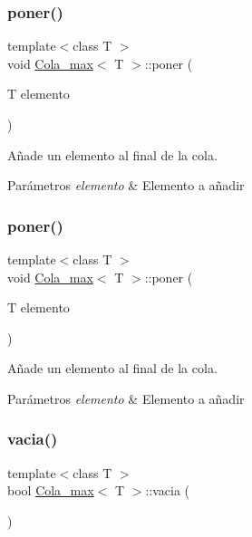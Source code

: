 \subsubsection{\texorpdfstring{poner()}{poner()}\hspace{0.1cm}{\footnotesize\ttfamily [1/2]}}
{\footnotesize\ttfamily template$<$class T $>$ \\
void \hyperlink{classCola__max}{Cola\+\_\+max}$<$ T $>$\+::poner (\begin{DoxyParamCaption}\item[{T}]{elemento }\end{DoxyParamCaption})}



Añade un elemento al final de la cola. 


\begin{DoxyParams}{Parámetros}
{\em elemento} & Elemento a añadir \\
\hline
\end{DoxyParams}
\mbox{\label{classCola__max_aaba30a35b89d26659408198baccee5aa}} 
\subsubsection{\texorpdfstring{poner()}{poner()}\hspace{0.1cm}{\footnotesize\ttfamily [2/2]}}
{\footnotesize\ttfamily template$<$class T $>$ \\
void \hyperlink{classCola__max}{Cola\+\_\+max}$<$ T $>$\+::poner (\begin{DoxyParamCaption}\item[{T}]{elemento }\end{DoxyParamCaption})}



Añade un elemento al final de la cola. 


\begin{DoxyParams}{Parámetros}
{\em elemento} & Elemento a añadir \\
\hline
\end{DoxyParams}
\mbox{\label{classCola__max_af0b18f86af91ef94d7a035f87a4dcb2b}} 
\subsubsection{\texorpdfstring{vacia()}{vacia()}\hspace{0.1cm}{\footnotesize\ttfamily [1/2]}}
{\footnotesize\ttfamily template$<$class T $>$ \\
bool \hyperlink{classCola__max}{Cola\+\_\+max}$<$ T $>$\+::vacia (\begin{DoxyParamCaption}{ }\end{DoxyParamCaption})}



